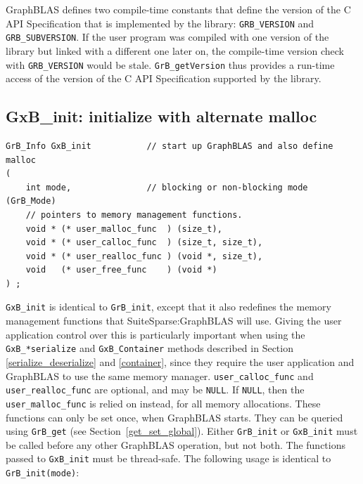 GraphBLAS defines two compile-time constants that
define the version of the C API Specification
that is implemented by the library:
\verb'GRB_VERSION' and \verb'GRB_SUBVERSION'.
If the user program was compiled with one
version of the library but linked with a different one later on, the
compile-time version check with \verb'GRB_VERSION' would be stale.
\verb'GrB_getVersion' thus provides a run-time access of the version of the C
API Specification supported by the library.

\subsection{{\sf GxB\_init:} initialize with alternate malloc} %
\label{xinit}

\begin{mdframed}[userdefinedwidth=6in]
{\footnotesize
\begin{verbatim}
GrB_Info GxB_init           // start up GraphBLAS and also define malloc
(
    int mode,               // blocking or non-blocking mode (GrB_Mode)
    // pointers to memory management functions.
    void * (* user_malloc_func  ) (size_t),
    void * (* user_calloc_func  ) (size_t, size_t),
    void * (* user_realloc_func ) (void *, size_t),
    void   (* user_free_func    ) (void *)
) ;
\end{verbatim}
}\end{mdframed}

\verb'GxB_init' is identical to \verb'GrB_init', except that it also redefines
the memory management functions that SuiteSparse:GraphBLAS will use.  Giving
the user application control over this is particularly important when using the
\verb'GxB_*serialize' and \verb'GxB_Container' methods described in Section
\ref{serialize_deserialize} and \ref{container}, since they require the user
application and GraphBLAS to use the same memory manager.
\verb'user_calloc_func' and \verb'user_realloc_func' are optional, and
may be \verb'NULL'.  If \verb'NULL', then the \verb'user_malloc_func' is
relied on instead, for all memory allocations.
These functions can only be set once, when GraphBLAS starts.
They can be queried using \verb'GrB_get' (see
Section~\ref{get_set_global}).
Either
\verb'GrB_init' or \verb'GxB_init' must be called before any other GraphBLAS
operation, but not both.  The functions passed to \verb'GxB_init' must be
thread-safe.
The following usage is identical to \verb'GrB_init(mode)':

